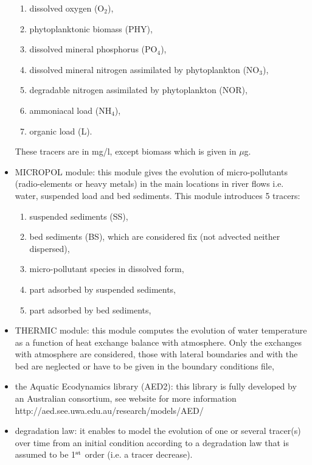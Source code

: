 \begin{itemize}
\begin{enumerate}
\item dissolved oxygen (O$_2$),

\item phytoplanktonic biomass (PHY),

\item dissolved mineral phosphorus (PO$_4$),

\item dissolved mineral nitrogen assimilated by phytoplankton (NO$_3$),

\item degradable nitrogen assimilated by phytoplankton (NOR),

\item ammoniacal load (NH$_4$),

\item  organic load (L).
\end{enumerate}

These tracers are in mg/l, except biomass which is given in $\mu$g.

\item MICROPOL module: this module gives the evolution of micro-pollutants
  (radio-elements or heavy metals) in the main locations in river flows
  i.e. water, suspended load and bed sediments.
  This module introduces 5 tracers:
\begin{enumerate}
\item suspended sediments (SS),

\item bed sediments (BS), which are considered fix (not advected neither dispersed),

\item micro-pollutant species in dissolved form,

\item part adsorbed by suspended sediments,

\item part adsorbed by bed sediments,
\end{enumerate}

\item THERMIC module: this module computes the evolution of water temperature
  as a function of heat exchange balance with atmosphere.
  Only the exchanges with atmosphere are considered, those with lateral boundaries
  and with the bed are neglected or have to be given in the boundary conditions file,
  
\item the Aquatic Ecodynamics library (AED2):
  this library is fully developed by an Australian consortium,
  see website for more information http://aed.see.uwa.edu.au/research/models/AED/ 

\item degradation law: it enables to model the evolution of one or several tracer(s)
over time from an initial condition according to a degradation law
that is assumed to be 1$^{\rm{st}}$ order (i.e. a tracer decrease).

\end{itemize}
